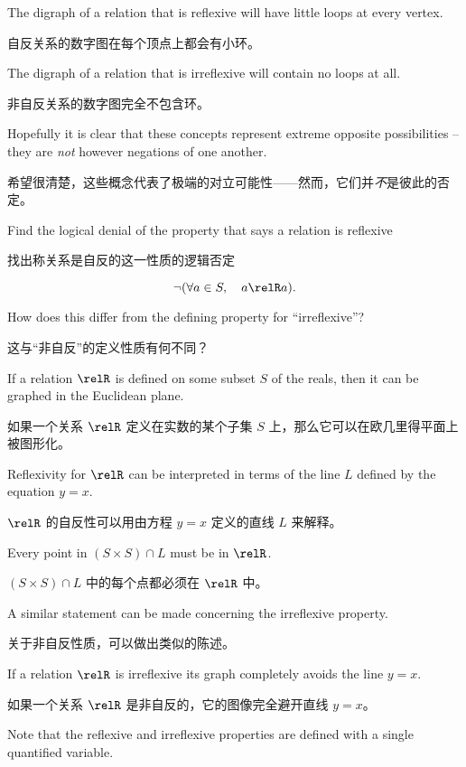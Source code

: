The digraph of a relation that is reflexive will have little loops at every vertex.

自反关系的数字图在每个顶点上都会有小环。

The digraph of a relation that is irreflexive will contain no loops at all.

非自反关系的数字图完全不包含环。

Hopefully it is clear that these concepts represent extreme opposite possibilities --
they are \emph{not} however negations of one another.

希望很清楚，这些概念代表了极端的对立可能性——然而，它们并\emph{不}是彼此的否定。

\begin{exer}
Find the logical denial of the property that says a relation is reflexive

\begin{exer}
找出称关系是自反的这一性质的逻辑否定

\[ {\lnot}(\forall a \in S, \quad a \relR a).
\]

How does this differ from the defining property for ``irreflexive''?
\end{exer}

这与“非自反”的定义性质有何不同？
\end{exer}

If a relation $\relR$ is defined on some subset $S$ of the reals, then it can be graphed
in the Euclidean plane.

如果一个关系 $\relR$ 定义在实数的某个子集 $S$ 上，那么它可以在欧几里得平面上被图形化。

Reflexivity for $\relR$ can be interpreted in terms of the line
$L$ defined by the equation $y=x$.

$\relR$ 的自反性可以用由方程 $y=x$ 定义的直线 $L$ 来解释。

Every point in $(S \times S) \cap L$
must be in $\relR$.

$(S \times S) \cap L$ 中的每个点都必须在 $\relR$ 中。

A similar statement can be made concerning the irreflexive property.

关于非自反性质，可以做出类似的陈述。

If a relation $\relR$ is irreflexive its graph completely avoids the line $y=x$.

如果一个关系 $\relR$ 是非自反的，它的图像完全避开直线 $y=x$。

Note that the reflexive and irreflexive properties are defined with a single quantified
variable.

